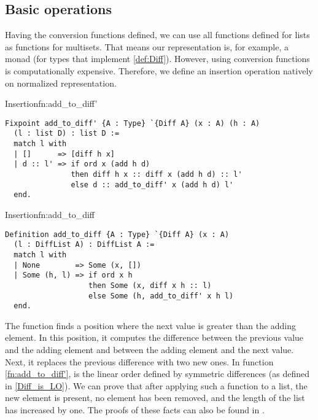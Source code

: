 \subsection{Basic operations}
Having the conversion functions defined, we can use all functions defined for lists as functions for multisets. That means our representation is, for example, a monad (for types that implement \ref{def:Diff}). However, using conversion functions is computationally expensive. Therefore, we define an insertion operation natively on normalized representation.
\begin{func}{Insertion}{fn:add_to_diff'}
\begin{verbatim}
Fixpoint add_to_diff' {A : Type} `{Diff A} (x : A) (h : A) 
  (l : list D) : list D :=
  match l with
  | []      => [diff h x]
  | d :: l' => if ord x (add h d)
               then diff h x :: diff x (add h d) :: l'
               else d :: add_to_diff' x (add h d) l'
  end.
\end{verbatim}
\end{func}
\begin{func}{Insertion}{fn:add_to_diff}
\begin{verbatim}
Definition add_to_diff {A : Type} `{Diff A} (x : A) 
  (l : DiffList A) : DiffList A :=
  match l with
  | None        => Some (x, [])
  | Some (h, l) => if ord x h
                   then Some (x, diff x h :: l)
                   else Some (h, add_to_diff' x h l)
  end.
\end{verbatim}
\end{func}
The function  finds a position where the next value is greater than the adding element. In this position, it computes the difference between the previous value and the adding element and between the adding element and the next value. Next, it replaces the previous difference with two new ones. In function \ref{fn:add_to_diff'},  is the linear order defined by symmetric differences (as defined in \ref{Diff_is_LO}). We can prove that after applying such a function to a list, the new element is present, no element has been removed, and the length of the list has increased by one. The proofs of these facts can also be found in .
